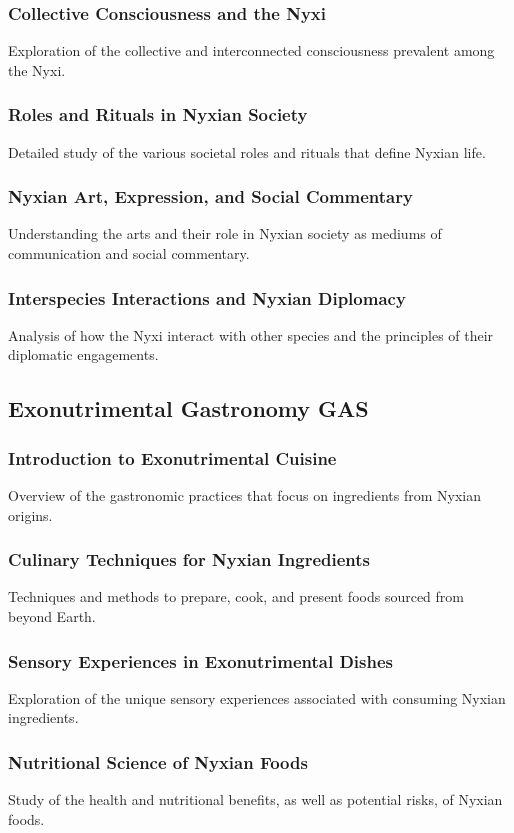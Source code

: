 \subsubsection{Collective Consciousness and the Nyxi}
Exploration of the collective and interconnected consciousness prevalent among the Nyxi.
\subsubsection{Roles and Rituals in Nyxian Society}
Detailed study of the various societal roles and rituals that define Nyxian life.
\subsubsection{Nyxian Art, Expression, and Social Commentary}
Understanding the arts and their role in Nyxian society as mediums of communication and social commentary.
\subsubsection{Interspecies Interactions and Nyxian Diplomacy}
Analysis of how the Nyxi interact with other species and the principles of their diplomatic engagements.


\subsection{Exonutrimental Gastronomy \hfill GAS}
\subsubsection{Introduction to Exonutrimental Cuisine}
Overview of the gastronomic practices that focus on ingredients from Nyxian origins.
\subsubsection{Culinary Techniques for Nyxian Ingredients}
Techniques and methods to prepare, cook, and present foods sourced from beyond Earth.
\subsubsection{Sensory Experiences in Exonutrimental Dishes}
Exploration of the unique sensory experiences associated with consuming Nyxian ingredients.
\subsubsection{Nutritional Science of Nyxian Foods}
Study of the health and nutritional benefits, as well as potential risks, of Nyxian foods.
